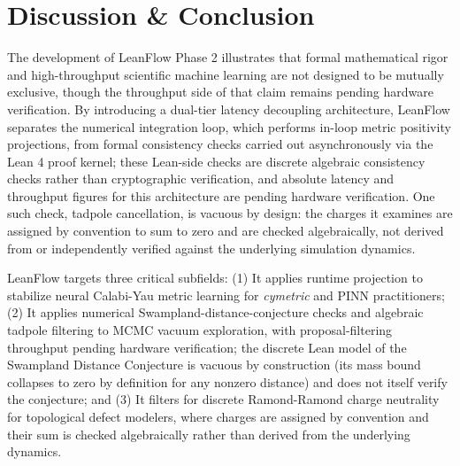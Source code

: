 \documentclass[11pt,a4paper]{article}
\begin{document}
\section{Discussion \& Conclusion}
\label{sec:conclusion}

The development of LeanFlow Phase 2 illustrates that formal mathematical rigor and high-throughput scientific machine learning are not designed to be mutually exclusive, though the throughput side of that claim remains pending hardware verification. By introducing a dual-tier latency decoupling architecture, LeanFlow separates the numerical integration loop, which performs in-loop metric positivity projections, from formal consistency checks carried out asynchronously via the Lean 4 proof kernel; these Lean-side checks are discrete algebraic consistency checks rather than cryptographic verification, and absolute latency and throughput figures for this architecture are pending hardware verification. One such check, tadpole cancellation, is vacuous by design: the charges it examines are assigned by convention to sum to zero and are checked algebraically, not derived from or independently verified against the underlying simulation dynamics.

LeanFlow targets three critical subfields:
(1) It applies runtime projection to stabilize neural Calabi-Yau metric learning for \emph{cymetric} and PINN practitioners;
(2) It applies numerical Swampland-distance-conjecture checks and algebraic tadpole filtering to MCMC vacuum exploration, with proposal-filtering throughput pending hardware verification; the discrete Lean model of the Swampland Distance Conjecture is vacuous by construction (its mass bound collapses to zero by definition for any nonzero distance) and does not itself verify the conjecture; and
(3) It filters for discrete Ramond-Ramond charge neutrality for topological defect modelers, where charges are assigned by convention and their sum is checked algebraically rather than derived from the underlying dynamics.
\end{document}
